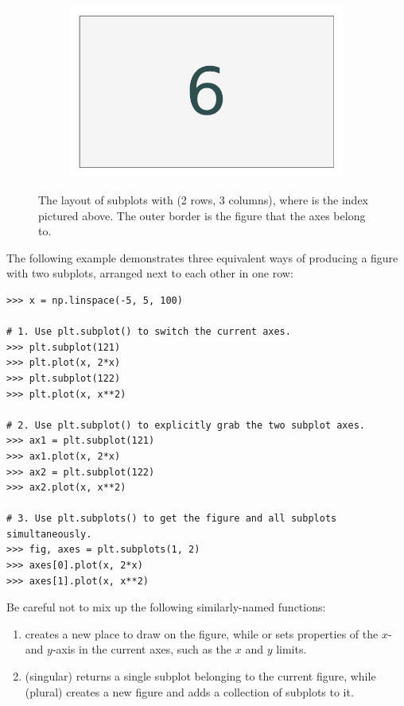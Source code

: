 \begin{figure}[H]
\begin{framed}
\begin{subfigure}{.32\textwidth}
\end{subfigure}
%
\begin{subfigure}{.32\textwidth}
    \centering
    \includegraphics[width=\linewidth]{figures/layout_6.pdf}
\end{subfigure}
\end{framed}
\caption{The layout of subplots with  (2 rows, 3 columns), where  is the index pictured above. The outer border is the figure that the axes belong to.}
\label{mpl:subplots-layout}
\end{figure}

The following example demonstrates three equivalent ways of producing a figure with two subplots, arranged next to each other in one row:
\begin{lstlisting}
>>> x = np.linspace(-5, 5, 100)

# 1. Use plt.subplot() to switch the current axes.
>>> plt.subplot(121)
>>> plt.plot(x, 2*x)
>>> plt.subplot(122)
>>> plt.plot(x, x**2)

# 2. Use plt.subplot() to explicitly grab the two subplot axes.
>>> ax1 = plt.subplot(121)
>>> ax1.plot(x, 2*x)
>>> ax2 = plt.subplot(122)
>>> ax2.plot(x, x**2)

# 3. Use plt.subplots() to get the figure and all subplots simultaneously.
>>> fig, axes = plt.subplots(1, 2)
>>> axes[0].plot(x, 2*x)
>>> axes[1].plot(x, x**2)
\end{lstlisting}

\begin{warn}
Be careful not to mix up the following similarly-named functions:
\begin{enumerate}
    \item {} creates a new place to draw on the figure, while  or  sets properties of the $x$- and $y$-axis in the current axes, such as the $x$ and $y$ limits.
    \item {} (singular) returns a single subplot belonging to the current figure, while  (plural) creates a new figure and adds a collection of subplots to it.
\end{enumerate}
\end{warn}

